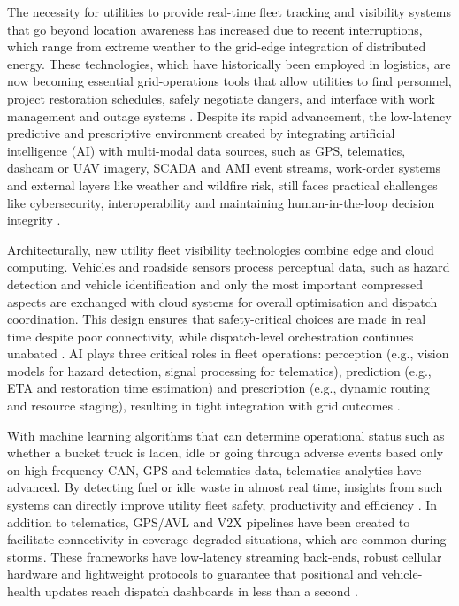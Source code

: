 The necessity for utilities to provide real-time fleet tracking and visibility systems that go beyond location awareness has increased due to recent interruptions, which range from extreme weather to the grid-edge integration of distributed energy. These technologies, which have historically been employed in logistics, are now becoming essential grid-operations tools that allow utilities to find personnel, project restoration schedules, safely negotiate dangers, and interface with work management and outage systems \cite{Oladimeji2023}. Despite its rapid advancement, the low-latency predictive and prescriptive environment created by integrating artificial intelligence (AI) with multi-modal data sources, such as GPS, telematics, dashcam or UAV imagery, SCADA and AMI event streams, work-order systems and external layers like weather and wildfire risk, still faces practical challenges like cybersecurity, interoperability and maintaining human-in-the-loop decision integrity \cite{Ficili2025}.

Architecturally, new utility fleet visibility technologies combine edge and cloud computing. Vehicles and roadside sensors process perceptual data, such as hazard detection and vehicle identification and only the most important compressed aspects are exchanged with cloud systems for overall optimisation and dispatch coordination. This design ensures that safety-critical choices are made in real time despite poor connectivity, while dispatch-level orchestration continues unabated \cite{Ficili2025, Katariya2024, Dong2024, Anon2024}. AI plays three critical roles in fleet operations: perception (e.g., vision models for hazard detection, signal processing for telematics), prediction (e.g., ETA and restoration time estimation) and prescription (e.g., dynamic routing and resource staging), resulting in tight integration with grid outcomes \cite{Sinha2024, Cavdar2022}.

With machine learning algorithms that can determine operational status such as whether a bucket truck is laden, idle or going through adverse events based only on high-frequency CAN, GPS and telematics data, telematics analytics have advanced. By detecting fuel or idle waste in almost real time, insights from such systems can directly improve utility fleet safety, productivity and efficiency \cite{vonGlehn2024, SmartFleet2023}. In addition to telematics, GPS/AVL and V2X pipelines have been created to facilitate connectivity in coverage-degraded situations, which are common during storms. These frameworks have low-latency streaming back-ends, robust cellular hardware and lightweight protocols to guarantee that positional and vehicle-health updates reach dispatch dashboards in less than a second \cite{Moumen2023a, Moumen2023b}.

